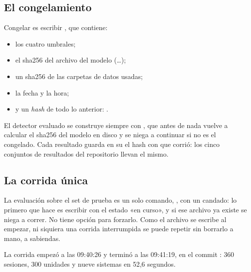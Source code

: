 \subsection{El congelamiento}

Congelar es escribir , que contiene:

\begin{itemize}
  \item los cuatro umbrales;
  \item el sha256 del archivo del modelo (…);
  \item un sha256 de las carpetas de datos usadas;
  \item la fecha y la hora;
  \item y un \emph{hash} de todo lo anterior: .
\end{itemize}

El detector evaluado se construye siempre con , que antes de nada vuelve a calcular el
sha256 del modelo en disco y se niega a continuar si no es el congelado. Cada resultado guarda en su
 el hash con que corrió: los cinco conjuntos de resultados del repositorio llevan el
mismo.

\subsection{La corrida única}

La evaluación sobre el set de prueba es un solo comando,
, con un candado: lo primero que hace es
escribir  con el estado «en curso», y si ese archivo ya existe se niega a
correr. No tiene opción para forzarlo. Como el archivo se escribe al empezar, ni siquiera una corrida
interrumpida se puede repetir sin borrarlo a mano, a sabiendas.

La corrida empezó a las 09:40:26 y terminó a las 09:41:19, en el commit : 360 sesiones,
300 unidades y nueve sistemas en 52,6 segundos.

